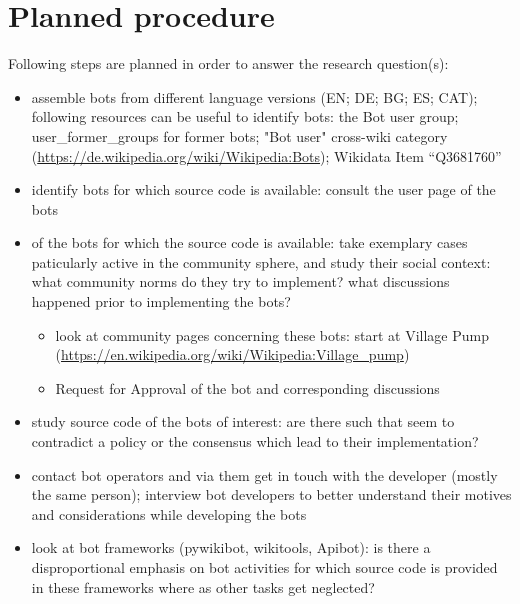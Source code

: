 \documentclass[pdftex,a4paper,11pt]{scrartcl}
\begin{document}

\section{Planned procedure}

Following steps are planned in order to answer the research question(s):

\begin{itemize}
    \item assemble bots from different language versions (EN; DE; BG; ES; CAT); following resources can be useful to identify bots: the Bot user group; user\_former\_groups for former bots; "Bot user" cross-wiki category (\url{https://de.wikipedia.org/wiki/Wikipedia:Bots}); Wikidata Item “Q3681760”
    \item identify bots for which source code is available: consult the user page of the bots
    \item of the bots for which the source code is available: take exemplary cases paticularly active in the community sphere, and study their social context: what community norms do they try to implement? what discussions happened prior to implementing the bots?
    \begin{itemize}
        \item look at community pages concerning these bots: start at Village Pump (\url{https://en.wikipedia.org/wiki/Wikipedia:Village_pump})
        \item Request for Approval of the bot and corresponding discussions
    \end{itemize}
    \item study source code of the bots of interest: are there such that seem to contradict a policy or the consensus which lead to their implementation?
    \item contact bot operators and via them get in touch with the developer (mostly the same person); interview bot developers to better understand their motives and considerations while developing the bots
    \item look at bot frameworks (pywikibot, wikitools, Apibot): is there a disproportional emphasis on bot activities for which source code is provided in these frameworks where as other tasks get neglected?

\end{itemize}
\end{document}

